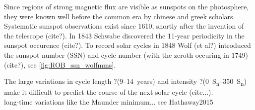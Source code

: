 Since regions of strong magnetic flux are visible as sunspots on the photosphere, they were known well before the common era by chinese and greek scholars. %
Systematic sunspot observations exist since 1610, shortly after the invention of the telescope (cite?). In 1843 Schwabe discovered the 11-year periodicity in the sunspot occurence (cite?). To record solar cycles in 1848 Wolf (et al?) introduced the sunspot number (SSN) and cycle number (with the zeroth occuring in 1749) (cite?), see \autoref{fig:ROB_ssn_wolfmms}.\\
\begin{figure}[htb]
\end{figure}
The large variations in cycle length ?(9--14~years) and intensity ?(\SIrange{0}{350}{S_n}) make it difficult to predict the course of the next solar cycle (cite...).\\
long-time variations like the Maunder minimum... see Hathaway2015\\


